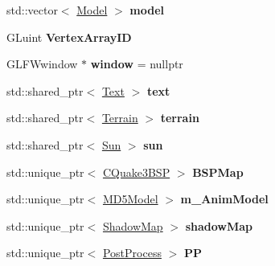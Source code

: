 \begin{DoxyCompactItemize}
\item 
std\+::vector$<$ \hyperlink{class_model}{Model} $>$ {\bfseries model}\hypertarget{class_epsilon_a23cf64e07be032abc3ffe969f037c87b}{}\label{class_epsilon_a23cf64e07be032abc3ffe969f037c87b}

\item 
G\+Luint {\bfseries Vertex\+Array\+ID}\hypertarget{class_epsilon_acb637f14e1d02d3286d4021dd546fbef}{}\label{class_epsilon_acb637f14e1d02d3286d4021dd546fbef}

\item 
G\+L\+F\+Wwindow $\ast$ {\bfseries window} = nullptr\hypertarget{class_epsilon_a12aad9914ca9e20307ff65807b1db252}{}\label{class_epsilon_a12aad9914ca9e20307ff65807b1db252}

\item 
std\+::shared\+\_\+ptr$<$ \hyperlink{class_text}{Text} $>$ {\bfseries text}\hypertarget{class_epsilon_a43b14c92523a1fec14d475c2b50bc932}{}\label{class_epsilon_a43b14c92523a1fec14d475c2b50bc932}

\item 
std\+::shared\+\_\+ptr$<$ \hyperlink{class_terrain}{Terrain} $>$ {\bfseries terrain}\hypertarget{class_epsilon_a794ce0e478c5f087feb664bcb3abcb7c}{}\label{class_epsilon_a794ce0e478c5f087feb664bcb3abcb7c}

\item 
std\+::shared\+\_\+ptr$<$ \hyperlink{class_sun}{Sun} $>$ {\bfseries sun}\hypertarget{class_epsilon_a9123a170e3b6f0f345c7b76ccde79403}{}\label{class_epsilon_a9123a170e3b6f0f345c7b76ccde79403}

\item 
std\+::unique\+\_\+ptr$<$ \hyperlink{class_c_quake3_b_s_p}{C\+Quake3\+B\+SP} $>$ {\bfseries B\+S\+P\+Map}\hypertarget{class_epsilon_a4209ad5c3f4198bedc354a3f453b90f6}{}\label{class_epsilon_a4209ad5c3f4198bedc354a3f453b90f6}

\item 
std\+::unique\+\_\+ptr$<$ \hyperlink{class_m_d5_model}{M\+D5\+Model} $>$ {\bfseries m\+\_\+\+Anim\+Model}\hypertarget{class_epsilon_afb0e90e9c8c15c9091cbf6dea4500f53}{}\label{class_epsilon_afb0e90e9c8c15c9091cbf6dea4500f53}

\item 
std\+::unique\+\_\+ptr$<$ \hyperlink{class_shadow_map}{Shadow\+Map} $>$ {\bfseries shadow\+Map}\hypertarget{class_epsilon_a5cec8f0efb9c91fb2f61b20264e3ef8d}{}\label{class_epsilon_a5cec8f0efb9c91fb2f61b20264e3ef8d}

\item 
std\+::unique\+\_\+ptr$<$ \hyperlink{class_post_process}{Post\+Process} $>$ {\bfseries PP}\hypertarget{class_epsilon_a3522839e0199c6896e56e5ac9ee98550}{}\label{class_epsilon_a3522839e0199c6896e56e5ac9ee98550}


\end{DoxyCompactItemize}
